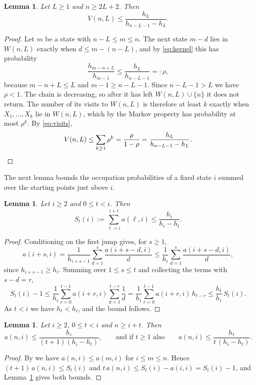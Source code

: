 \documentclass[11pt]{amsart}
\newtheorem{lemma}[theorem]{Lemma}
\theoremstyle{remark}
\numberwithin{equation}{section}
\begin{document}
\begin{lemma}\label{lem:window}
Let $L\ge1$ and $n\ge2L+2$. Then
\[
V(n,L)\le\frac{h_L}{h_{n-L-1}-h_L}.
\]
\end{lemma}

\begin{proof}
Let $m$ be a state with $n-L\le m\le n$. The next state $m-d$ lies in $W(n,L)$ exactly when $d\le m-(n-L)$, and by
\eqref{eq:kernel} this has probability
\[
\frac{h_{m-n+L}}{h_{m-1}}\le\frac{h_L}{h_{n-L-1}}=:\rho,
\]
because $m-n+L\le L$ and $m-1\ge n-L-1$. Since $n-L-1>L$ we have $\rho<1$. The chain is decreasing, so after it has left
$W(n,L)\cup\{n\}$ it does not return. The number of its visits to $W(n,L)$ is therefore at least $k$ exactly when
$X_1,\dots,X_k$ lie in $W(n,L)$, which by the Markov property has probability at most $\rho^k$. By \eqref{eq:visits},
\[
V(n,L)\le\sum_{k\ge1}\rho^k=\frac{\rho}{1-\rho}=\frac{h_L}{h_{n-L-1}-h_L}.\qedhere
\]
\end{proof}

The next lemma bounds the occupation probabilities of a fixed state $i$ summed over the starting points just above $i$.

\begin{lemma}\label{lem:start}
Let $i\ge2$ and $0\le t<i$. Then
\[
S_t(i):=\sum_{\ell=i}^{i+t}a(\ell,i)\le\frac{h_i}{h_i-h_t}.
\]
\end{lemma}

\begin{proof}
Conditioning on the first jump gives, for $s\ge1$,
\[
a(i+s,i)=\frac{1}{h_{i+s-1}}\sum_{d=1}^{s}\frac{a(i+s-d,i)}{d}\le\frac{1}{h_i}\sum_{d=1}^{s}\frac{a(i+s-d,i)}{d},
\]
since $h_{i+s-1}\ge h_i$. Summing over $1\le s\le t$ and collecting the terms with $s-d=r$,
\[
S_t(i)-1\le\frac{1}{h_i}\sum_{r=0}^{t-1}a(i+r,i)\sum_{d=1}^{t-r}\frac1d
=\frac{1}{h_i}\sum_{r=0}^{t-1}a(i+r,i)\,h_{t-r}\le\frac{h_t}{h_i}\,S_t(i).
\]
As $t<i$ we have $h_t<h_i$, and the bound follows.
\end{proof}

\begin{lemma}\label{lem:point}
Let $i\ge2$, $0\le t<i$ and $n\ge i+t$. Then
\[
a(n,i)\le\frac{h_i}{(t+1)(h_i-h_t)},\qquad\text{and if }t\ge1\text{ also}\qquad a(n,i)\le\frac{h_t}{t\,(h_i-h_t)}.
\]
\end{lemma}

\begin{proof}
By \cite[Theorem~1.1(i)]{BCM} we have $a(n,i)\le a(m,i)$ for $i\le m\le n$. Hence
$(t+1)\,a(n,i)\le S_t(i)$ and $t\,a(n,i)\le S_t(i)-a(i,i)=S_t(i)-1$, and Lemma~\ref{lem:start} gives both bounds.
\end{proof}
\end{document}
